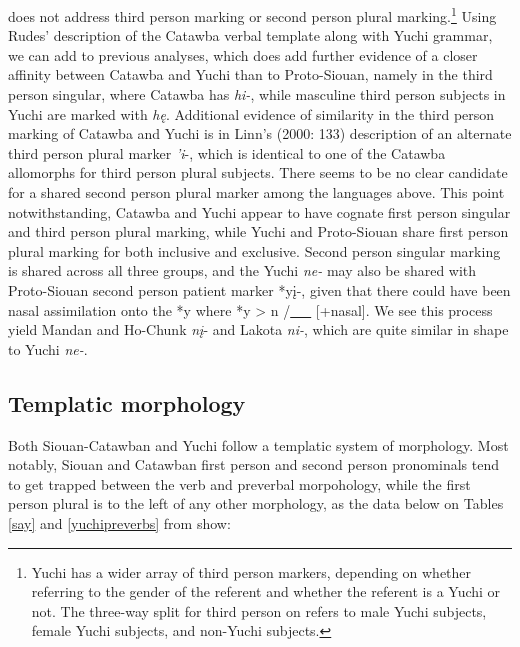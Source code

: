 \documentclass[output=paper]{LSP/langsci}
\begin{document}
\citet{Rankin1998scy} does not address third person marking or second person plural marking.\footnote{Yuchi has a wider array of third person markers, depending on whether referring to the gender of the referent and whether the referent is a Yuchi or not. The three-way split for third person on  refers to male Yuchi subjects, female Yuchi subjects, and non-Yuchi subjects.} Using Rudes' \citeyear{Rudes2007} description of the Catawba verbal template along with  Yuchi grammar, we can add to previous analyses, which does add further evidence of a closer affinity between Catawba and Yuchi than to Proto-Siouan, namely in the third person singular, where Catawba has \emph{hi-}, while masculine third person subjects in Yuchi are marked with \emph{h\k{e}}. Additional evidence of similarity in the third person marking of Catawba and Yuchi is in Linn's (2000: 133) description of an alternate third person plural marker \emph{'i}-, which is identical to one of the Catawba allomorphs for third person plural subjects. There seems to be no clear candidate for a shared second person plural marker among the languages above. This point notwithstanding, Catawba and Yuchi appear to have cognate first person singular and third person plural marking, while Yuchi and Proto-Siouan share first person plural marking for both inclusive and exclusive. Second person singular marking is shared across all three groups, and the Yuchi \emph{ne-} may also be shared with Proto-Siouan second person patient marker *y\k{i}-, given that there could have been nasal assimilation onto the *y where *y > n /\underline{~~~} [+nasal]. We see this process yield Mandan and Ho-Chunk \emph{n\k{i}}- and Lakota \emph{ni-}, which are quite similar in shape to Yuchi \emph{ne-}.

\subsection{Templatic morphology}

Both Siouan-Catawban and Yuchi follow a templatic system of morphology. Most notably, Siouan and Catawban first person and second person pronominals tend to get trapped between the verb and preverbal morpohology, while the first person plural is to the left of any other morphology, as the data below on Tables \ref{say} and \ref{yuchipreverbs} from \citet{Rankin1998scy} show:
\end{document}
